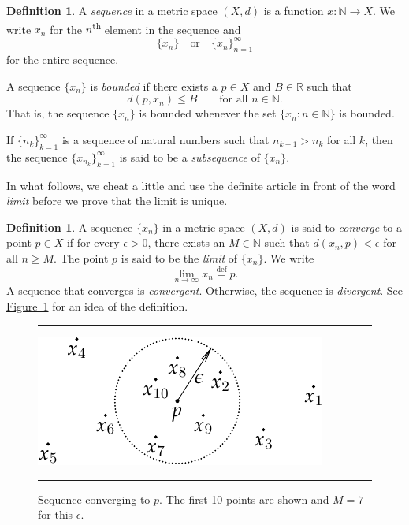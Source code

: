 \documentclass[12pt,openany]{book}
\newcommand{\R}{{\mathbb{R}}}
\newcommand{\N}{{\mathbb{N}}}
\newcommand{\myindex}[1]{#1\index{#1}}
\theoremstyle{plain}
\theoremstyle{remark}
\theoremstyle{definition}
\newtheorem{defn}[thm]{Definition}
\newenvironment{myfig}{%
\begin{figure}[h!t]
\noindent\rule{\textwidth}{0.5pt}\vspace{12pt}\par\centering}%
{\par\noindent\rule{\textwidth}{0.5pt}
\end{figure}}
\theoremstyle{exercise}
\theoremstyle{example}
\newcommand{\figureref}[1]{\hyperref[#1]{Figure~\ref*{#1}}}
\begin{document}
\begin{defn}
A \emph{\myindex{sequence}} in a metric space $(X,d)$ is a function
$x \colon \N \to X$.  We write $x_n$ for the $n$\textsuperscript{th} element in
the sequence and
%
\begin{equation*}
\{ x_n \} \quad \text{or} \quad
\{ x_n \}_{n=1}^\infty 
\end{equation*}
for the entire sequence.

A sequence $\{ x_n \}$ is \emph{bounded} if
there exists a $p \in X$ and $B \in \R$ such that
\begin{equation*}
d(p,x_n) \leq B \qquad \text{for all } n \in \N.
\end{equation*}
That is, the sequence $\{x_n\}$ is bounded whenever
the set $\{ x_n : n \in \N \}$
is bounded.

If $\{ n_k \}_{k=1}^\infty$ is a sequence of natural numbers
such that $n_{k+1} > n_k$ for all $k$, then
the sequence $\{ x_{n_k} \}_{k=1}^\infty$
is said to be
a \emph{\myindex{subsequence}} of $\{x_n \}$.
\end{defn}

In what follows, we cheat a little
and use the definite article in front of the word \emph{limit}
before we prove that the limit is unique.

\begin{defn}
A sequence $\{ x_n \}$ in a metric space $(X,d)$ is said
to \emph{converge} to a point
$p \in X$ if for every $\epsilon > 0$, there exists an $M \in \N$ such
that $d(x_n,p) < \epsilon$ for all $n \geq M$.  The point $p$
is said to be the \emph{limit}
of $\{ x_n \}$.  We write
\begin{equation*}
\lim_{n\to \infty} x_n \overset{\text{def}}{=} p .
\end{equation*}
A sequence
that converges is \emph{convergent}.
Otherwise, the sequence is 
\emph{divergent}.
See \figureref{fig:sequence-convergence-metric} for an idea of
the definition.
\begin{myfig}
\includegraphics{figures/sequence-convergence-metric}
\caption{Sequence converging to $p$.  The first 10 points 
are shown and $M=7$ for this $\epsilon$.\label{fig:sequence-convergence-metric}}
\end{myfig}
\end{defn}
\end{document}
